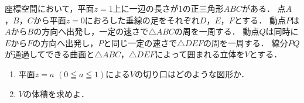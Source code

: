 \documentclass[../../main.tex]{subfiles}
\begin{document}
座標空間において，平面$z=1$上に一辺の長さが1の正三角形$ABC$がある．
点$A$，$B$，$C$から平面$z=0$におろした垂線の足をそれぞれ$D$，$E$，$F$とする．
動点$P$は$A$から$B$の方向へ出発し，一定の速さで$\triangle ABC$の周を一周する．
動点$Q$は同時に$E$から$F$の方向へ出発し，$P$と同じ一定の速さで$\triangle DEF$の周を一周する．
線分$PQ$が通過してできる曲面と$\triangle ABC$，$\triangle DEF$によって囲まれる立体を$V$とする．
\begin{enumerate}
  \item 平面$z=a$ $(0 \leqq a \leqq 1)$による$V$の切り口はどのような図形か．
  \item $V$の体積を求めよ．
\end{enumerate}
\end{document}
